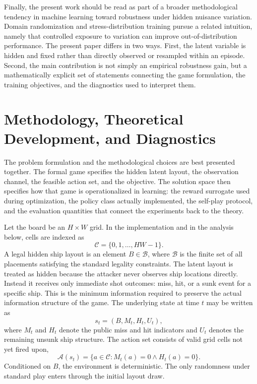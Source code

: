\documentclass[11pt]{article}
\newcommand{\A}{\mathcal{A}}
\newcommand{\Bset}{\mathcal{B}}
\begin{document}
Finally, the present work should be read as part of a broader methodological tendency in machine learning toward robustness under hidden nuisance variation. Domain randomization and stress-distribution training pursue a related intuition, namely that controlled exposure to variation can improve out-of-distribution performance. The present paper differs in two ways. First, the latent variable is hidden and fixed rather than directly observed or resampled within an episode. Second, the main contribution is not simply an empirical robustness gain, but a mathematically explicit set of statements connecting the game formulation, the training objectives, and the diagnostics used to interpret them.

\section{Methodology, Theoretical Development, and Diagnostics}

The problem formulation and the methodological choices are best presented together. The formal game specifies the hidden latent layout, the observation channel, the feasible action set, and the objective. The solution space then specifies how that game is operationalized in learning: the reward surrogate used during optimization, the policy class actually implemented, the self-play protocol, and the evaluation quantities that connect the experiments back to the theory.

Let the board be an $H\times W$ grid. In the implementation and in the analysis below, cells are indexed as
\[
\mathcal{C}=\{0,1,\dots,HW-1\}.
\]
A legal hidden ship layout is an element $B\in\Bset$, where $\Bset$ is the finite set of all placements satisfying the standard legality constraints. The latent layout is treated as hidden because the attacker never observes ship locations directly. Instead it receives only immediate shot outcomes: miss, hit, or a sunk event for a specific ship. This is the minimum information required to preserve the actual information structure of the game. The underlying state at time $t$ may be written as
\[
s_t=(B,M_t,H_t,U_t),
\]
where $M_t$ and $H_t$ denote the public miss and hit indicators and $U_t$ denotes the remaining unsunk ship structure. The action set consists of valid grid cells not yet fired upon,
\[
\A(s_t)=\{a\in\mathcal{C}: M_t(a)=0 \wedge H_t(a)=0\}.
\]
Conditioned on $B$, the environment is deterministic. The only randomness under standard play enters through the initial layout draw.
\end{document}
